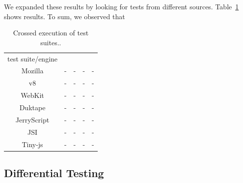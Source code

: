 \documentclass[10pt,conference,anonymous]{IEEEtran}
\begin{document}
We expanded these results by looking for tests from different
sources.  Table~\ref{tab:cross-testing} shows
results. To sum, we observed that 

\begin{table}[h]
  \centering
  \caption{\label{tab:cross-testing}Crossed execution of test suites..}
  \begin{tabular}{crrrr}
    \toprule
    test suite/engine & \jsc{} & \veight{} & \chakra{} & \smonkey{} \\
    Mozilla & - & - & - & -  \\
    v8 & - & - & - & -  \\
    WebKit & - & - & - & -  \\
    Duktape & - & - & - & -  \\
    JerryScript & - & - & - & -  \\
    JSI & - & - & - & -  \\
    Tiny-js & - & - & - & -  \\
    \bottomrule 
  \end{tabular}
\end{table}  



\subsection{Differential Testing}
\end{document}
